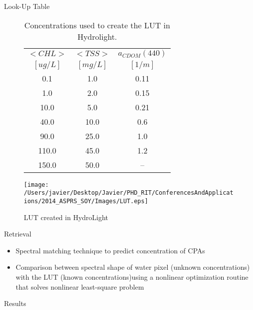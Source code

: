 \documentclass[mathserif]{beamer}
\begin{document}
\begin{frame}{}
\begin{columns}[t]
\begin{column}{.3\linewidth}
\begin{block}{Look-Up Table}
\begin{figure}[htb]
  \begin{minipage}[c]{0.44\linewidth}
    \begin{table}[!ht]
    \caption{\small Concentrations used to create the LUT in Hydrolight. \label{tab:LUTconc} } 
    \centering\footnotesize
    \begin{tabular}{c|c|c}
                \bfseries{$<CHL>$}    & \bfseries{$<TSS>$}  & \bfseries{$a_{CDOM}(440)$}\\
        $[ug/L]$      & $[mg/L]$ &  $[1/m]$\\ \hline \hline
    0.1   & 1.0  &  0.11\\
    1.0   & 2.0  &  0.15\\
    10.0   & 5.0  &  0.21\\
    40.0   & 10.0 &  0.6 \\
    90.0  & 25.0 &  1.0 \\
    110.0  & 45.0 &  1.2 \\
    150.0  & 50.0 &  --  \\     
        \end{tabular}
    \end{table}
  \end{minipage}
  \hfill
  \begin{minipage}[d]{0.54\linewidth}  
    \centering
      \texttt{[image: /Users/javier/Desktop/Javier/PHD\_RIT/ConferencesAndApplications/2014\_ASPRS\_SOY/Images/LUT.eps]}
      \caption{LUT created in HydroLight}
      \label{fig:LUT}
  \end{minipage}
\end{figure}

\end{block}
\begin{block}{Retrieval}
  \begin{itemize}
    \item Spectral matching technique to predict concentration of CPAs
    \vspace{0.5cm}
    \item Comparison between spectral shape of water pixel (unknown concentrations) with the LUT (known concentrations)using a nonlinear optimization routine that solves nonlinear least-square problem
  \end{itemize}
\end{block}

\begin{block}{Results}


\end{block}
\end{column}
\end{columns}
\end{frame}
\end{document}
